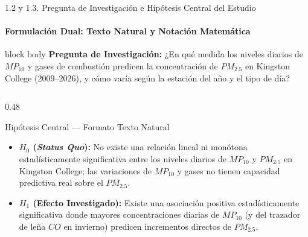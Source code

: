 \documentclass[aspectratio=169, 9pt]{beamer}
\begin{document}
\begin{frame}{1.2 y 1.3. Pregunta de Investigación e Hipótesis Central del Estudio}
\framesubtitle{Formulación Dual: Texto Natural y Notación Matemática}

\begin{beamercolorbox}[wd=\textwidth, rounded=true, sep=3pt]{block body}
  \scriptsize\textbf{Pregunta de Investigación:} ¿En qué medida los niveles diarios de $MP_{10}$ y gases de combustión predicen la concentración de $PM_{2.5}$ en Kingston College (2009–2026), y cómo varía según la estación del año y el tipo de día?
\end{beamercolorbox}

\vspace{0.06cm}
\begin{columns}[T]
  \begin{column}{0.48\textwidth}
    \begin{alertblock}{\footnotesize Hipótesis Central — Formato Texto Natural}
      \scriptsize
      \begin{itemize}\setlength{\itemsep}{2pt}
        \item \textbf{$H_0$ (\textit{Status Quo}):} No existe una relación lineal ni monótona estadísticamente significativa entre los niveles diarios de $MP_{10}$ y $PM_{2.5}$ en Kingston College; las variaciones de $MP_{10}$ y gases no tienen capacidad predictiva real sobre el $PM_{2.5}$.
        \item \textbf{$H_1$ (Efecto Investigado):} Existe una asociación positiva estadísticamente significativa donde mayores concentraciones diarias de $MP_{10}$ (y del trazador de leña $CO$ en invierno) predicen incrementos directos de $PM_{2.5}$.
      \end{itemize}
    \end{alertblock}
  \end{column}


\end{columns}
\end{frame}
\end{document}
